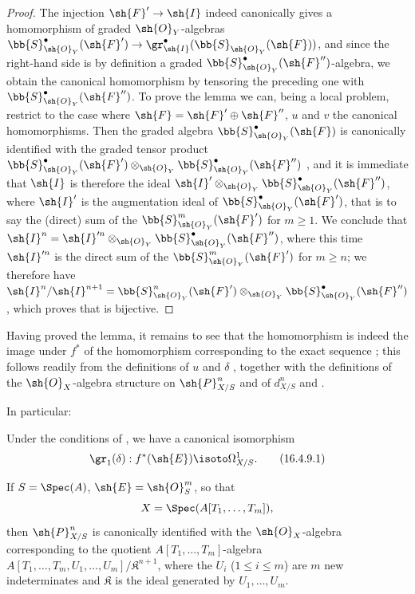 \begin{proof}
The injection $\sh{F}' \to \sh{I}$ indeed canonically gives a homomorphism of graded $\sh{O}_Y$-algebras $\bb{S}_{\sh{O}_Y}^\bullet(\sh{F}') \to \gr_\sh{I}^\bullet(\bb{S}_{\sh{O}_Y}(\sh{F}))$, and since the right-hand side is by definition a graded $\bb{S}_{\sh{O}_Y}^\bullet(\sh{F}'')$-algebra, we obtain the canonical homomorphism  by tensoring the preceding one with $\bb{S}_{\sh{O}_Y}^\bullet(\sh{F}'')$.
To prove the lemma we can, being a local problem, restrict to the case where $\sh{F} = \sh{F}' \oplus \sh{F}''$, $u$ and $v$ the canonical homomorphisms.
Then the graded algebra $\bb{S}_{\sh{O}_Y}^\bullet(\sh{F})$ is canonically identified with the graded tensor product $\bb{S}_{\sh{O}_Y}^\bullet(\sh{F}') \otimes_{\sh{O}_Y} \bb{S}_{\sh{O}_Y}^\bullet(\sh{F}'')$ , and it is immediate that $\sh{I}$ is therefore the ideal $\sh{I}' \otimes_{\sh{O}_Y} \bb{S}_{\sh{O}_Y}^\bullet(\sh{F}'')$, where $\sh{I}'$ is the augmentation ideal of $\bb{S}_{\sh{O}_Y}^\bullet(\sh{F}')$, that is to say the (direct) sum of the $\bb{S}_{\sh{O}_Y}^m(\sh{F}')$ for $m \geq 1$.
We conclude that $\sh{I}^n = \sh{I}'^n \otimes_{\sh{O}_Y} \bb{S}_{\sh{O}_Y}^\bullet(\sh{F}'')$, where this time $\sh{I}'^n$ is the direct sum of the $\bb{S}_{\sh{O}_Y}^m(\sh{F}')$ for $m \geq n$;
we therefore have $\sh{I}^n/\sh{I}^{n+1} = \bb{S}_{\sh{O}_Y}^n(\sh{F}') \otimes_{\sh{O}_Y} \bb{S}_{\sh{O}_Y}^\bullet(\sh{F}'')$, which proves that  is bijective.
\end{proof}

Having proved the lemma, it remains to see that the homomorphism  is indeed the image under $f^*$ of the homomorphism  corresponding to the exact sequence ;
this follows readily from the definitions of $u$  and $\delta$ , together with the definitions of the $\sh{O}_X$-algebra structure on $\sh{P}_{X/S}^n$ and of $d_{X/S}^n$  and .

In particular:

\begin{corollary}[16.4.9]
\label{IV.16.4.9}
Under the conditions of , we have a canonical isomorphism
\[
\label{IV.16.4.9.1}
  \gr_1(\delta): f^*(\sh{E}) \isoto \Omega_{X/S}^1.
  \tag{16.4.9.1}
\]
\end{corollary}

\begin{corollary}[16.4.10]
\label{IV.16.4.10}
If $S = \Spec(A)$, $\sh{E} = \sh{O}_S^m$, so that
\[
  X = \Spec(A[T_1, \dots, T_m]),
\]
then $\sh{P}_{X/S}^n$ is canonically identified with the $\sh{O}_X$-algebra corresponding to the quotient $A[T_1, \dots, T_m]$-algebra\\
$A[T_1, \dots, T_m, U_1, \dots, U_m]/\mathfrak{K}^{n+1}$, where the $U_i$ ($1 \leq i \leq m$) are $m$ new indeterminates and $\mathfrak{K}$ is the ideal generated by $U_1, \dots, U_m$.
\end{corollary}

